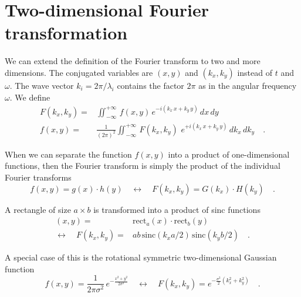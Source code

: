 \section{Two-dimensional Fourier transformation}

We can extend the definition of the Fourier transform to two and more dimensions. The conjugated variables are $(x,y)$ and $(k_x, k_y)$ instead of $t$ and $\omega$. The wave vector $k_i = 2\pi / \lambda_i$ contains the factor $2\pi$ as in the angular frequency $\omega$. We define
\begin{align}
  F(k_x, k_y) = & \iint_{-\infty}^{+\infty} \, f(x,y) \, e^{- i (k_x \, x + k_y \, y )} \, dx \, dy \\
  f(x,y) = & \frac{1}{(2 \pi )^2} \iint_{-\infty}^{+\infty} \, F(k_x, k_y) \,\, e^{+ i (k_x \, x + k_y \, y )}  \, dk_x \,dk_y \quad .
 \end{align}

When we can separate the function $f(x,y)$ into a product of one-dimensional functions, then  the Fourier transform is simply the product of the individual Fourier transforms
\begin{equation}
  f(x,y) = g(x) \cdot h(y) \quad \leftrightarrow \quad 
  F(k_x, k_y) = G(k_x) \cdot H(k_y) \quad .
\end{equation}

A rectangle of size $a \times b$ is transformed into a product of sinc functions
\begin{align}
  (x,y) = & \text{rect} _a (x) \cdot \text{rect} _b (y) \\
  \leftrightarrow \quad  F(k_x, k_y) = & a b \, \text{sinc}( k_x a /2) \, \text{sinc}( k_y b /2) \quad .
\end{align}


A special case of this is the rotational symmetric two-dimensional Gaussian function
\begin{equation}
  f(x,y) = 
  \frac{1}{2 \pi \sigma^2} \, e^{-  \frac{x^2 + y^2}{2 \sigma^2} }
  \quad \leftrightarrow \quad 
  F(k_x, k_y) = e^{- \frac{\sigma^2 }{2} \left(k_x^2 + k_y^2 \right)  } \quad .
\end{equation}

